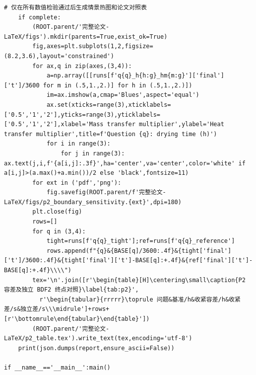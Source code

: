 \begin{Verbatim}[fontsize=\scriptsize,breaklines=true,breakanywhere=true]
    # 仅在所有数值检验通过后生成情景热图和论文对照表
    if complete:
        (ROOT.parent/'完整论文-LaTeX/figs').mkdir(parents=True,exist_ok=True)
        fig,axes=plt.subplots(1,2,figsize=(8.2,3.6),layout='constrained')
        for ax,q in zip(axes,(3,4)):
            a=np.array([[runs[f'q{q}_h{h:g}_hm{m:g}']['final']['t']/3600 for m in (.5,1.,2.)] for h in (.5,1.,2.)])
            im=ax.imshow(a,cmap='Blues',aspect='equal')
            ax.set(xticks=range(3),xticklabels=['0.5','1','2'],yticks=range(3),yticklabels=['0.5','1','2'],xlabel='Mass transfer multiplier',ylabel='Heat transfer multiplier',title=f'Question {q}: drying time (h)')
            for i in range(3):
                for j in range(3): ax.text(j,i,f'{a[i,j]:.3f}',ha='center',va='center',color='white' if a[i,j]>(a.max()+a.min())/2 else 'black',fontsize=11)
        for ext in ('pdf','png'):
            fig.savefig(ROOT.parent/f'完整论文-LaTeX/figs/p2_boundary_sensitivity.{ext}',dpi=180)
        plt.close(fig)
        rows=[]
        for q in (3,4):
            tight=runs[f'q{q}_tight'];ref=runs[f'q{q}_reference']
            rows.append(f"{q}&{BASE[q]/3600:.4f}&{tight['final']['t']/3600:.4f}&{tight['final']['t']-BASE[q]:+.4f}&{ref['final']['t']-BASE[q]:+.4f}\\\\")
        tex='\n'.join([r'\begin{table}[H]\centering\small\caption{P2 容差及独立 BDF2 终点对照}\label{tab:p2}',
          r'\begin{tabular}{rrrrr}\toprule 问题&基准/h&收紧容差/h&收紧差/s&独立差/s\\\midrule']+rows+[r'\bottomrule\end{tabular}\end{table}'])
        (ROOT.parent/'完整论文-LaTeX/p2_table.tex').write_text(tex,encoding='utf-8')
    print(json.dumps(report,ensure_ascii=False))

if __name__=='__main__':main()
\end{Verbatim}


